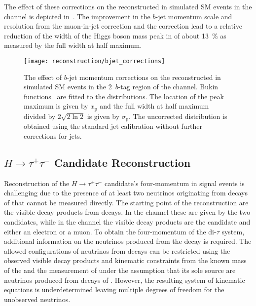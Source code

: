 The effect of these corrections on the reconstructed \mBB in simulated SM \HH
events in the \hadhad channel is depicted
in~. The improvement in the $b$-jet momentum
scale and resolution from the muon-in-jet correction and the \pTreco correction
lead to a relative reduction of the width of the Higgs boson mass peak in \mBB
of about \SI{13}{\percent} as measured by the full width at half maximum.

\begin{figure}[htbp]
  \centering

  \texttt{[image: reconstruction/bjet\_corrections]}

  \caption[The effect of $b$-jet momentum corrections on the reconstructed \mBB
  in simulated SM~\HH events in the 2~$b$-tag region of the \hadhad
  channel.]{The effect of $b$-jet momentum corrections on the reconstructed \mBB
    in simulated SM \HH events in the 2~$b$-tag region of the \hadhad
    channel. Bukin functions~\cite{Bukin:2007zha} are fitted to the \mBB
    distributions. The location of the peak maximum is given by $x_{\text{p}}$
    and the full width at half maximum divided by $2\sqrt{2 \ln 2}$ is given by
    $\sigma_{\text{p}}$.  The uncorrected distribution is obtained using the
    standard jet calibration without further corrections for \btagged jets.}%
  \label{fig:bjet_momentum_corr_mbb}
\end{figure}


\subsection{$H \to \tau^{+}\tau^{-}$ Candidate Reconstruction}%
\label{sec:htautau_reco}

Reconstruction of the $H \to \tau^{+}\tau^{-}$ candidate's four-momentum in
signal events is challenging due to the presence of at least two neutrinos
originating from decays of \tauleptons that cannot be measured directly. The
starting point of the reconstruction are the visible decay products from
\taulepton decays. In the \hadhad channel these are given by the two \tauhadvis
candidates, while in the \lephad channel the visible decay products are the
\tauhadvis candidate and either an electron or a muon. To obtain the
four-momentum of the di-$\tau$ system, %
additional information on the neutrinos produced from the \taulepton decay is
required. The allowed configurations of neutrinos from \taulepton decays can be
restricted using the observed visible decay products and kinematic constraints
from the known mass of the \taulepton and the measurement of \pTmiss under the
assumption that its sole source are neutrinos produced from decays of
\tauleptons. However, the resulting system of kinematic equations is
underdetermined leaving multiple degrees of freedom for the unobserved
neutrinos.


